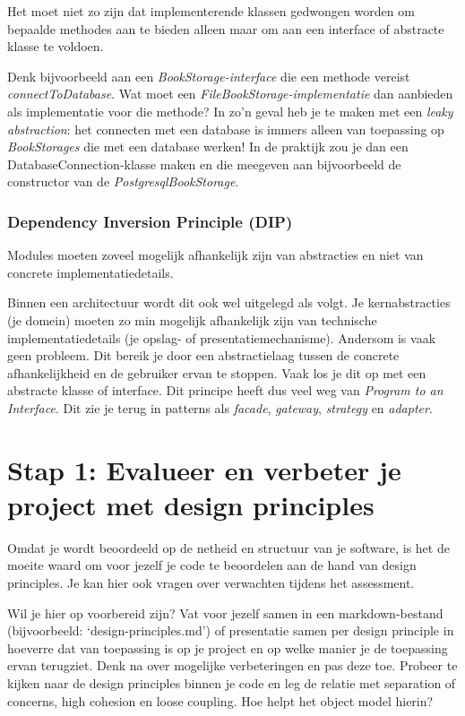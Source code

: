 Het moet niet zo zijn dat implementerende klassen 
gedwongen worden om bepaalde methodes aan te bieden 
alleen maar om aan een interface of abstracte klasse te
voldoen. 

Denk bijvoorbeeld aan een \textit{BookStorage-interface}
die een methode vereist \textit{connectToDatabase}. Wat moet een
\textit{FileBookStorage-implementatie} dan aanbieden als implementatie
voor die methode? 
In zo'n geval heb je te maken met een \textit{leaky abstraction}:
het connecten met een database is immers alleen van 
toepassing op \textit{BookStorages} die met een database werken!
In de praktijk zou je dan een DatabaseConnection-klasse maken en die 
meegeven aan bijvoorbeeld de constructor van de \textit{PostgresqlBookStorage}.

\subsubsection{Dependency Inversion Principle (DIP)}
Modules moeten zoveel mogelijk afhankelijk zijn van abstracties
en niet van concrete implementatiedetails. 

Binnen een architectuur 
wordt dit ook wel uitgelegd als volgt. Je kernabstracties (je domein) moeten
zo min mogelijk afhankelijk zijn van technische implementatiedetails 
(je opslag- of presentatiemechanisme). Andersom is vaak geen probleem.
Dit bereik je door een abstractielaag tussen de concrete afhankelijkheid 
en de gebruiker ervan te stoppen. Vaak los je dit op met een abstracte klasse of interface.
Dit principe heeft dus veel weg van \textit{Program to an Interface}.
Dit zie je terug in patterns als 
\textit{facade}, \textit{gateway}, \textit{strategy} en \textit{adapter}.

\section{Stap 1: Evalueer en verbeter je project met design principles}
Omdat je wordt beoordeeld op de netheid en structuur van je software,
is het de moeite waard om voor jezelf je code te beoordelen aan de hand 
van design principles. Je kan hier ook vragen over verwachten tijdens 
het assessment.

Wil je hier op voorbereid zijn?
Vat voor jezelf samen in een markdown-bestand (bijvoorbeeld: `design-principles.md') 
of presentatie samen per design principle in hoeverre dat van toepassing is op je project en op 
welke manier je de toepassing ervan terugziet. 
Denk na over mogelijke verbeteringen en pas deze toe.
Probeer te kijken naar de design principles binnen je code
en leg de relatie met separation of concerns, high cohesion en loose coupling.
Hoe helpt het object model hierin? 

